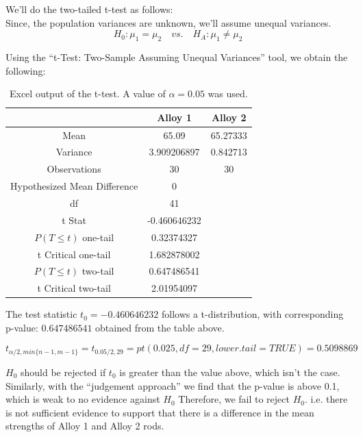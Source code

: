 \documentclass[letterpaper]{article}
\begin{document}
We'll do the two-tailed t-test as follows:\\
Since, the population variances are unknown, we'll assume unequal variances.
$$H_0: \mu_1 = \mu_2 \quad vs. \quad H_A: \mu_1 \neq \mu_2 $$


Using the ``t-Test: Two-Sample Assuming Unequal Variances'' tool, we obtain the following:

\begin{table}[H]
 \centering
 \begin{tabular}{c|c|c|}
                               & Alloy 1      & Alloy 2  \\ \hline
  Mean                         & 65.09        & 65.27333 \\ \hline
  Variance                     & 3.909206897  & 0.842713 \\ \hline
  Observations                 & 30           & 30       \\ \hline
  Hypothesized Mean Difference & 0            &          \\ \hline
  df                           & 41           &          \\ \hline
  t Stat                       & -0.460646232 &          \\ \hline
  $P(T \leq t)$ one-tail       & 0.32374327   &          \\ \hline
  t Critical one-tail          & 1.682878002  &          \\ \hline
  $P(T \leq t)$ two-tail       & 0.647486541  &          \\ \hline
  t Critical two-tail          & 2.01954097   &          \\ \hline
 \end{tabular}
 \caption{Excel output of the t-test. A value of $\alpha = 0.05$ was used.}
 \label{5a}
\end{table}

The test statistic $t_0 = -0.460646232$ follows a t-distribution, with
corresponding p-value: $0.647486541$ obtained from the table above.

$$t_{\alpha/2, min\{n-1, m-1\}} = t_{0.05/2, 29} = pt(0.025, df=29, lower.tail=TRUE) = 0.5098869$$

$H_0$ should be rejected if $t_0$ is greater than the value above, which isn't
the case. Similarly, with the ``judgement approach'' we find that the p-value is
above 0.1, which is weak to no evidence against $H_0$ Therefore, we fail to
reject $H_0$. i.e. there is not sufficient evidence to support that there is a
difference in the mean strengths of Alloy 1 and Alloy 2 rods.
\end{document}
